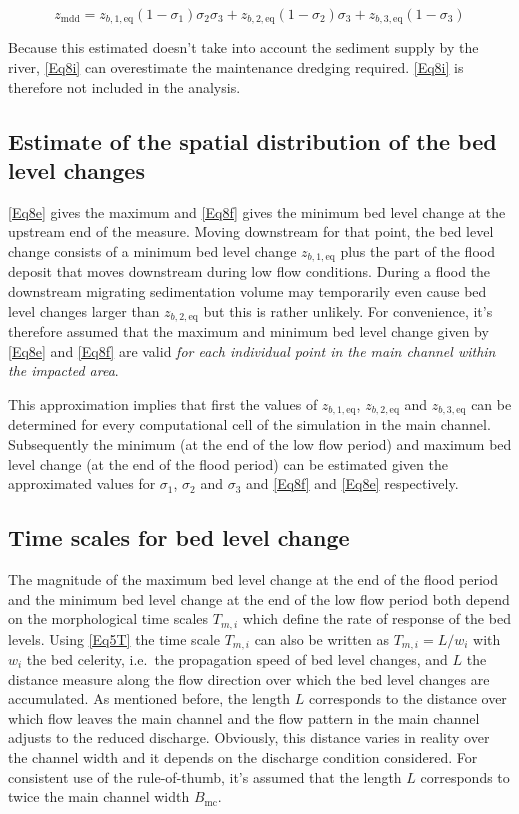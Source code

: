 \begin{equation}
z_\text{mdd} = z_{b,1,\text{eq}}(1-\sigma_1) \sigma_2 \sigma_3 + z_{b,2,\text{eq}} (1-\sigma_2) \sigma_3 + z_{b,3,\text{eq}} (1-\sigma_3)
\label{Eq8i}
\end{equation}

Because this estimated doesn't take into account the sediment supply by the river, \autoref{Eq8i} can overestimate the maintenance dredging required.
\autoref{Eq8i} is therefore not included in the \dfastmi analysis.

\subsection{Estimate of the spatial distribution of the bed level changes}

\autoref{Eq8e} gives the maximum and \autoref{Eq8f} gives the minimum bed level change at the upstream end of the measure.
Moving downstream for that point, the bed level change consists of a minimum bed level change $z_{b,1,\text{eq}}$ plus the part of the flood deposit that moves downstream during low flow conditions.
During a flood the downstream migrating sedimentation volume may temporarily even cause bed level changes larger than $z_{b,2,\text{eq}}$ but this is rather unlikely.
For convenience, it's therefore assumed that the maximum and minimum bed level change given by \autoref{Eq8e} and \autoref{Eq8f} are valid \emph{for each individual point in the main channel within the impacted area}.

This approximation implies that first the values of $z_{b,1,\text{eq}}$, $z_{b,2,\text{eq}}$ and $z_{b,3,\text{eq}}$ can be determined for every computational cell of the simulation in the main channel.
Subsequently the minimum (at the end of the low flow period) and maximum bed level change (at the end of the flood period) can be estimated given the approximated values for $\sigma_1$, $\sigma_2$ and $\sigma_3$ and \autoref{Eq8f} and \autoref{Eq8e} respectively.

\subsection{Time scales for bed level change}

The magnitude of the maximum bed level change at the end of the flood period and the minimum bed level change at the end of the low flow period both depend on the morphological time scales $T_{m,i}$  which define the rate of response of the bed levels.
Using \autoref{Eq5T} the time scale $T_{m,i}$ can also be written as $T_{m,i} = L/w_i$ with $w_i$ the bed celerity, i.e.~the propagation speed of bed level changes, and $L$ the distance measure along the flow direction over which the bed level changes are accumulated.
As mentioned before, the length $L$ corresponds to the distance over which flow leaves the main channel and the flow pattern in the main channel adjusts to the reduced discharge.
Obviously, this distance varies in reality over the channel width and it depends on the discharge condition considered.
For consistent use of the rule-of-thumb, it's assumed that the length $L$ corresponds to twice the main channel width $B_\text{mc}$.

